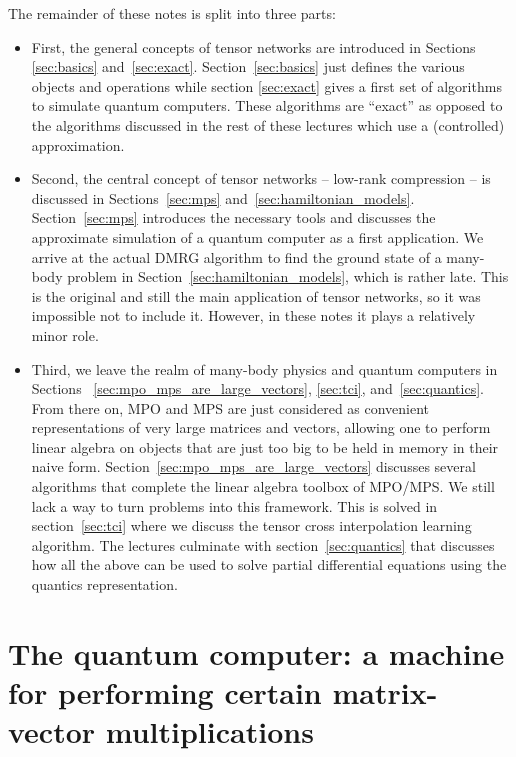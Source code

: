 \documentclass{SciPost}
\begin{document}
The remainder of these notes is split into three parts:
\begin{itemize}


\item First, the general concepts of tensor networks are introduced in Sections~
\ref{sec:basics} and~\ref{sec:exact}. Section~\ref{sec:basics} just defines
the various objects and operations while section \ref{sec:exact} gives a first
set of algorithms to simulate quantum computers. These algorithms are ``exact''
as opposed to the algorithms discussed in the rest of these lectures which use a (controlled) approximation.

\item Second, the central concept of tensor networks -- low-rank compression -- is discussed in Sections~\ref{sec:mps} and~\ref{sec:hamiltonian_models}.
Section~\ref{sec:mps} introduces the necessary tools and discusses the approximate simulation of a quantum computer as a first application. We arrive at the actual DMRG algorithm to find the ground state of a many-body problem in 
Section~\ref{sec:hamiltonian_models}, which is rather late. This is the original and still the main application of tensor networks, so it was impossible not to include it. However, in these notes it plays a relatively minor role.

\item Third, we leave the realm of many-body physics and quantum computers in Sections~
\ref{sec:mpo_mps_are_large_vectors}, \ref{sec:tci}, and~\ref{sec:quantics}.
From there on, MPO and MPS are just considered as convenient representations of very large matrices and vectors, allowing one to perform linear algebra on objects that are just too big to be held in memory in their naive form.
Section~\ref{sec:mpo_mps_are_large_vectors} discusses several algorithms that complete the linear algebra toolbox of MPO/MPS. We still lack a way to turn problems into this
framework. This is solved in section~\ref{sec:tci} where we discuss the tensor cross interpolation learning algorithm. The lectures culminate with section~\ref{sec:quantics} that discusses how all the above can be used to solve partial differential equations using the quantics representation.
\end{itemize}
\section{The quantum computer: a machine for performing certain matrix-vector multiplications}
\label{sec:qc}
\end{document}
